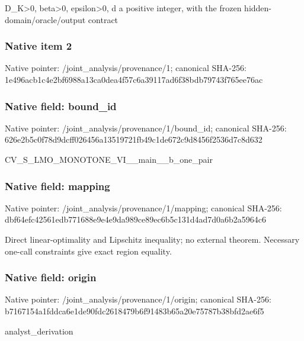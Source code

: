 \documentclass[10pt,a4paper]{article}
\begin{document}
\begingroup\raggedright\sloppy D\_\allowbreak{}K>0,\allowbreak{} beta>0,\allowbreak{} epsilon>0,\allowbreak{} d a positive integer,\allowbreak{} with the frozen hidden-domain/\allowbreak{}oracle/\allowbreak{}output contract\par\endgroup

\subsubsection{Native item 2}
Native pointer: /joint\_\allowbreak{}analysis/provenance/1; canonical SHA-256: 1e496acb1c4e2bf6988a13ca0dea4f57c6a39117ad6f38bdb79743f765ee76ac

\subsubsection{Native field: bound\_\allowbreak{}id}
Native pointer: /joint\_\allowbreak{}analysis/provenance/1/bound\_\allowbreak{}id; canonical SHA-256: 626e2b5c0f78d9dcff026456a13519721fb49c1de672c9d8456f2536d7c8d632

\begingroup\raggedright\sloppy CV\_\allowbreak{}S\_\allowbreak{}LMO\_\allowbreak{}MONOTONE\_\allowbreak{}VI\_\allowbreak{}\_\allowbreak{}main\_\allowbreak{}\_\allowbreak{}b\_\allowbreak{}one\_\allowbreak{}pair\par\endgroup

\subsubsection{Native field: mapping}
Native pointer: /joint\_\allowbreak{}analysis/provenance/1/mapping; canonical SHA-256: dbf64efc42561edb771688e9e4e9da989ce89ec6b5c131d4ad7d0a6b2a5964c6

\begingroup\raggedright\sloppy Direct linear-optimality and Lipschitz inequality;\allowbreak{} no external theorem. Necessary one-call constraints give exact region equality.\par\endgroup

\subsubsection{Native field: origin}
Native pointer: /joint\_\allowbreak{}analysis/provenance/1/origin; canonical SHA-256: b7167154a1fddca6e1de90fdc2618479b6f91483b65a20e75787b38bfd2ae6f5

\begingroup\raggedright\sloppy analyst\_\allowbreak{}derivation\par\endgroup
\end{document}
